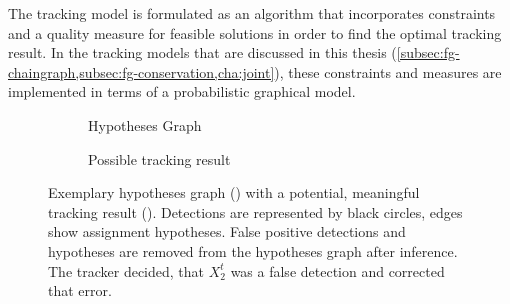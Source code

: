 The tracking model is formulated as an algorithm that incorporates constraints and a quality measure
for feasible solutions in order to find the optimal tracking result. In the tracking models that are
discussed in this thesis (\cref{subsec:fg-chaingraph,subsec:fg-conservation,cha:joint}), these
constraints and measures are implemented in terms of a probabilistic graphical model.


\begin{figure}
    \centering
    \begin{subfigure}{0.44\textwidth}
        \centering
        \scalebox{0.9}{
            \begin{tikzpicture}[minimum size=58pt,scale=0.45, every node/.style={scale=0.45, text=black, font=\LARGE}, thick]
                
            \end{tikzpicture}
        }
        \caption{Hypotheses Graph}
        \label{subfig:hypotheses-graph-example}
    \end{subfigure}
    \hfill
    \begin{subfigure}{0.44\textwidth}
        \centering
        \scalebox{0.9}{
            \begin{tikzpicture}[minimum size=58pt,scale=0.45, every node/.style={scale=0.45, text=black, font=\LARGE}, thick]
                
            \end{tikzpicture}
        }
        \caption{Possible tracking result}
        \label{subfig:hypotheses-graph-example-inferred}
    \end{subfigure}
    \caption[Exemplary hypotheses graph]{Exemplary hypotheses graph
        () with a potential, meaningful tracking result
        (). Detections are represented by black
        circles, edges show assignment hypotheses. False positive detections and hypotheses are
        removed from the hypotheses graph after inference. The tracker decided, that $X_2^t$ was a
        false detection and corrected that error.}
    \label{fig:tba-hypotheses-graph}
\end{figure}


